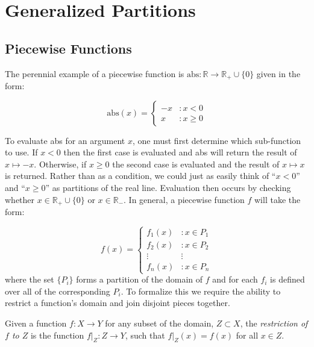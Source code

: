 \chapter{Generalized Partitions}
\section{Piecewise Functions}
\doublespacing



The perennial example of a piecewise function is $\mathrm{abs}:\mathbb{R} \to \mathbb{R}_{+} \cup \{ 0 \}$ given in the form:

\begin{equation}
\mathrm{abs}(x) = 
  \left\{
     \begin{array}{lr}
       -x & : x < 0 \\
       x & : x \geq 0
     \end{array}
   \right.
\end{equation}

To evaluate abs for an argument $x$, one must first determine which sub-function to use. 
If $x < 0$ then the first case is evaluated and abs will return the result of $x \mapsto -x$. 
Otherwise, if $x \geq 0$ the second case is evaluated and the result of $x \mapsto x$ is returned. 
Rather than as a condition, we could just as easily think of ``$x<0$'' and ``$x \geq 0$'' as partitions of the real line.
Evaluation then occurs by checking whether $x\in \mathbb{R}_{+} \cup \{ 0 \} $ or $x \in \mathbb{R}_{-}$.
In general, a piecewise function $f$ will take the form:

\begin{equation}
f(x) = 
  \left\{
     \begin{array}{lr}
       f_1(x) & : x \in P_1 \\
       f_2(x) & : x \in P_2 \\ 
       \vdots & \vdots \\
       f_n(x) & : x \in P_n
     \end{array}
   \right.
   \label{eq_fP}
\end{equation}
where the set $\{ P _ i \}$ forms a partition of the domain of $f$ and for each $f_i$ is defined over all of the corresponding $P_i$. To formalize this we require the ability to restrict a function's domain and join disjoint pieces together.

\begin{definition}
Given a function $f:X \to Y$ for any subset of the domain, $Z \subset X$, the \emph{restriction of $f$ to $Z$} is the function $f|_Z : Z \to Y$, such that $f|_Z(x) = f(x)$ for all $x \in Z$.
\end{definition}



